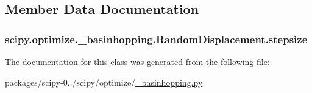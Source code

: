 \subsection{Member Data Documentation}
\hypertarget{classscipy_1_1optimize_1_1__basinhopping_1_1RandomDisplacement_a7a95c352140dd181c4ab950217134ffe}{}
\subsubsection[{stepsize}]{\setlength{\rightskip}{0pt plus 5cm}scipy.\+optimize.\+\_\+basinhopping.\+Random\+Displacement.\+stepsize}\label{classscipy_1_1optimize_1_1__basinhopping_1_1RandomDisplacement_a7a95c352140dd181c4ab950217134ffe}


The documentation for this class was generated from the following file\+:\begin{DoxyCompactItemize}
\item 
packages/scipy-\/0../scipy/optimize/\hyperlink{__basinhopping_8py}{\+\_\+basinhopping.\+py}\end{DoxyCompactItemize}

